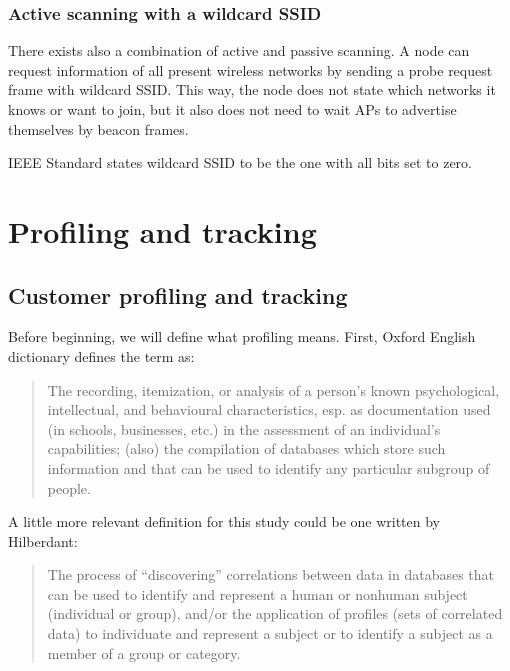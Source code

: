 \documentclass[12pt,a4paper,oneside,pdftex]{report}
\begin{document}
\subsection{Active scanning with a wildcard SSID}
\label{subsec:active_wildcard}

There exists also a combination of active and passive scanning. A node can request information of all present wireless networks by sending a probe request frame with wildcard SSID. This way, the node does not state which networks it knows or want to join, but it also does not need to wait APs to advertise themselves by beacon frames.

IEEE Standard states wildcard SSID to be the one with all bits set to zero. 




\chapter{Profiling and tracking}
\label{chapter:profiling}

\section{Customer profiling and tracking}
\label{sec:profiling}

Before beginning, we will define what profiling means. First, Oxford English dictionary defines the term as:~\cite{oed_profiling}

\begin{quotation}
The recording, itemization, or analysis of a person's known psychological, intellectual, and behavioural characteristics, esp. as documentation used (in schools, businesses, etc.) in the assessment of an individual's capabilities; (also) the compilation of databases which store such information and that can be used to identify any particular subgroup of people.
\end{quotation}

A little more relevant definition for this study could be one written by Hilberdant:~\cite{hildebrandt2008}

\begin{quotation}
The process of ``discovering'' correlations between data in databases that can be used to identify and represent a human or nonhuman subject (individual or group), and/or the application of profiles (sets of correlated data) to individuate and represent a subject or to identify a subject as a member of a group or category.
\end{quotation}
\end{document}
